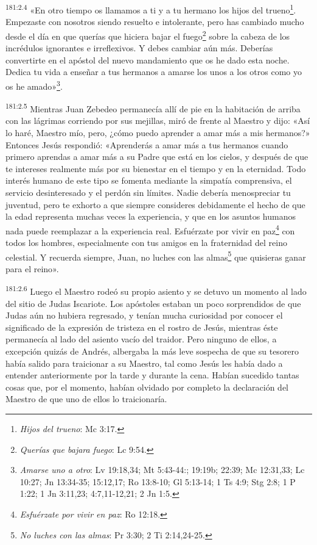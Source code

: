 \par 
\textsuperscript{181:2.4} «En otro tiempo os llamamos a ti y a tu hermano los hijos del trueno\footnote{\textit{Hijos del trueno}: Mc 3:17.}. Empezaste con nosotros siendo resuelto e intolerante, pero has cambiado mucho desde el día en que querías que hiciera bajar el fuego\footnote{\textit{Querías que bajara fuego}: Lc 9:54.} sobre la cabeza de los incrédulos ignorantes e irreflexivos. Y debes cambiar aún más. Deberías convertirte en el apóstol del nuevo mandamiento que os he dado esta noche. Dedica tu vida a enseñar a tus hermanos a amarse los unos a los otros como yo os he amado»\footnote{\textit{Amarse uno a otro}: Lv 19:18,34; Mt 5:43-44:; 19:19b; 22:39; Mc 12:31,33; Lc 10:27; Jn 13:34-35; 15:12,17; Ro 13:8-10; Gl 5:13-14; 1 Ts 4:9; Stg 2:8; 1 P 1:22; 1 Jn 3:11,23; 4:7,11-12,21; 2 Jn 1:5.}.

\par 
\textsuperscript{181:2.5} Mientras Juan Zebedeo permanecía allí de pie en la habitación de arriba con las lágrimas corriendo por sus mejillas, miró de frente al Maestro y dijo: «Así lo haré, Maestro mío, pero, ¿cómo puedo aprender a amar más a mis hermanos?» Entonces Jesús respondió: «Aprenderás a amar más a tus hermanos cuando primero aprendas a amar más a su Padre que está en los cielos, y después de que te intereses realmente más por su bienestar en el tiempo y en la eternidad. Todo interés humano de este tipo se fomenta mediante la simpatía comprensiva, el servicio desinteresado y el perdón sin límites. Nadie debería menospreciar tu juventud, pero te exhorto a que siempre consideres debidamente el hecho de que la edad representa muchas veces la experiencia, y que en los asuntos humanos nada puede reemplazar a la experiencia real. Esfuérzate por vivir en paz\footnote{\textit{Esfuérzate por vivir en paz}: Ro 12:18.} con todos los hombres, especialmente con tus amigos en la fraternidad del reino celestial. Y recuerda siempre, Juan, no luches con las almas\footnote{\textit{No luches con las almas}: Pr 3:30; 2 Ti 2:14,24-25.} que quisieras ganar para el reino».

\par 
\textsuperscript{181:2.6} Luego el Maestro rodeó su propio asiento y se detuvo un momento al lado del sitio de Judas Iscariote. Los apóstoles estaban un poco sorprendidos de que Judas aún no hubiera regresado, y tenían mucha curiosidad por conocer el significado de la expresión de tristeza en el rostro de Jesús, mientras éste permanecía al lado del asiento vacío del traidor. Pero ninguno de ellos, a excepción quizás de Andrés, albergaba la más leve sospecha de que su tesorero había salido para traicionar a su Maestro, tal como Jesús les había dado a entender anteriormente por la tarde y durante la cena. Habían sucedido tantas cosas que, por el momento, habían olvidado por completo la declaración del Maestro de que uno de ellos lo traicionaría.

